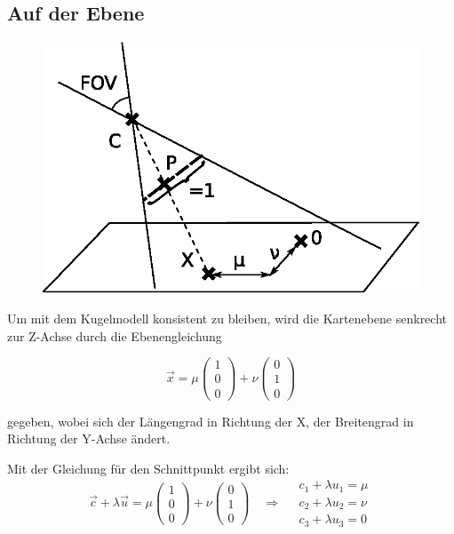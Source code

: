 \documentclass[10pt]{scrreprt}
\begin{document}
\subsection{Auf der Ebene}
\begin{figure}
\includegraphics[scale=0.75]{algo/SchnittEbene.eps}
\end{figure}

Um mit dem Kugelmodell konsistent zu bleiben, wird die Kartenebene senkrecht zur Z-Achse durch die Ebenengleichung

\[\vec{x} = \mu\left(\begin{array}{c}1\\0\\0\end{array}\right)+\nu\left(\begin{array}{c}0\\1\\0\end{array}\right)\]

gegeben, wobei sich der Längengrad in Richtung der X, der Breitengrad in Richtung der Y-Achse ändert.

Mit der Gleichung für den Schnittpunkt ergibt sich:
\[
\vec{c}+\lambda\vec{u}=\mu\left(\begin{array}{c}1\\0\\0\end{array}\right)+ \nu\left(\begin{array}{c}0\\1\\0\end{array}\right)\quad\Rightarrow\quad\begin{array}{c}c_1+\lambda u_1 = \mu\\c_2 + \lambda u_2 = \nu\\c_3 + \lambda u_3 = 0\end{array}
\]\\
\end{document}
